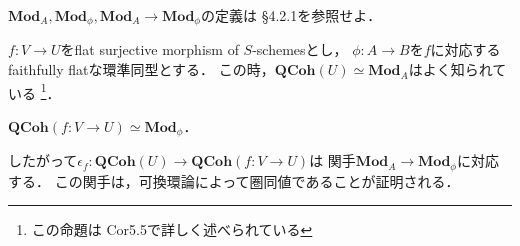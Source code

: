 \documentclass[a4paper]{jsarticle}
\newcommand{\QCoh}{\mathbf{QCoh}}
\newcommand{\Mod}{\mathbf{Mod}}
\begin{document}
    $\Mod_A, \Mod_{\phi}, \Mod_A \to \Mod_{\phi}$の定義は
    \cite{NoteGroTop} \S4.2.1を参照せよ．

    $f \colon V \to U$をflat surjective morphism of $S$-schemesとし，
    $\phi \colon A \to B$を$f$に対応するfaithfully flatな環準同型とする．
    この時，$\QCoh(U) \simeq \Mod_A$はよく知られている
    \footnote{この命題は\cite{HarAG} Cor5.5で詳しく述べられている}．
    \begin{Claim}
        $\QCoh(f \colon V \to U) \simeq \Mod_{\phi}$．
    \end{Claim}
    したがって$\epsilon_{f} \colon \QCoh(U) \to \QCoh(f \colon V \to U)$は
    関手$\Mod_A \to \Mod_{\phi}$に対応する．
    この関手は，可換環論によって圏同値であることが証明される．



\end{document}
